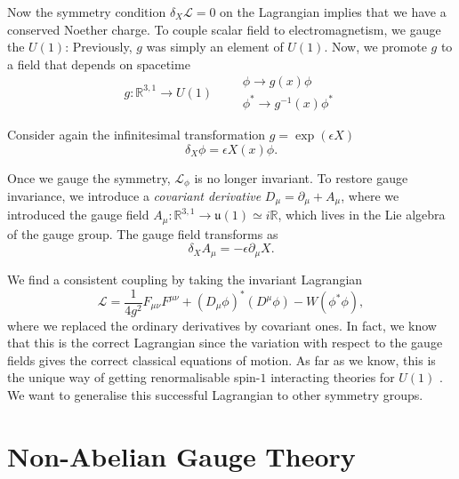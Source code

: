 
Now the symmetry condition $\delta_X \mathcal{L} = 0$ on the Lagrangian implies that we have a conserved Noether charge.
To couple scalar field to electromagnetism, we gauge the $U(1)$: Previously, $g$ was simply an element of $U(1)$. Now, we promote $g$ to a field that depends on spacetime
\begin{equation}
  g\colon \mathbb{R}^{3, 1} \to {U}(1) \qquad
  \begin{gathered}
    \phi \to g(x) \phi \\
    \phi^* \to g^{-1}(x) \phi^*
  \end{gathered}
\end{equation}

Consider again the infinitesimal transformation $g = \exp(\epsilon X)$
\begin{equation}
  \delta_X \phi = \epsilon X(x) \phi.
\end{equation}

Once we gauge the symmetry, $\mathcal{L}_\phi$ is no longer invariant. To restore gauge invariance, we introduce a \emph{covariant derivative} $D_{\mu} = \partial_{\mu} + A_{\mu}$, where we introduced the gauge field $A_{\mu}\colon \mathbb{R}^{3, 1} \to \mathfrak{u}(1) \simeq i \mathbb{R}$, which lives in the Lie algebra of the gauge group.
The gauge field transforms as
\begin{equation}
  \delta_X A_{\mu} = - \epsilon \partial_{\mu} X.
\end{equation}

We find a consistent coupling by taking the invariant Lagrangian
\begin{equation}
  \mathcal{L} = \frac{1}{4 g^2} F_{\mu\nu} F^{\mu\nu} + (D_{\mu} \phi)^* (D^{\mu} \phi) - W(\phi^* \phi),
\end{equation}
where we replaced the ordinary derivatives by covariant ones.
In fact, we know that this is the correct Lagrangian since the variation with respect to the gauge fields gives the correct classical equations of motion.
As far as we know, this is the unique way of getting renormalisable spin-$1$ interacting theories for $U(1)$ .
We want to generalise this successful Lagrangian to other symmetry groups.

\section{Non-Abelian Gauge Theory}%
\label{sec:non_abelian_gauge_theory}

